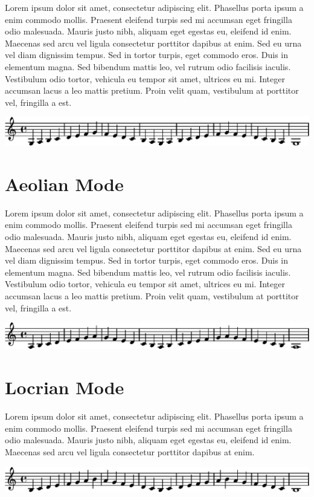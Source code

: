 \documentclass[11pt]{article}
\begin{document}
Lorem ipsum dolor sit amet, consectetur adipiscing elit. Phasellus porta ipsum a enim commodo mollis. Praesent eleifend turpis sed mi accumsan eget fringilla odio malesuada. Mauris justo nibh, aliquam eget egestas eu, eleifend id enim. Maecenas sed arcu vel ligula consectetur porttitor dapibus at enim. Sed eu urna vel diam dignissim tempus. Sed in tortor turpis, eget commodo eros. Duis in elementum magna. Sed bibendum mattis leo, vel rutrum odio facilisis iaculis. Vestibulum odio tortor, vehicula eu tempor sit amet, ultrices eu mi. Integer accumsan lacus a leo mattis pretium. Proin velit quam, vestibulum at porttitor vel, fringilla a est.
\linebreak


\includegraphics[width=17cm]{mixolydian.eps}
\section*{Aeolian Mode}
\label{sec-6}

Lorem ipsum dolor sit amet, consectetur adipiscing elit. Phasellus porta ipsum a enim commodo mollis. Praesent eleifend turpis sed mi accumsan eget fringilla odio malesuada. Mauris justo nibh, aliquam eget egestas eu, eleifend id enim. Maecenas sed arcu vel ligula consectetur porttitor dapibus at enim. Sed eu urna vel diam dignissim tempus. Sed in tortor turpis, eget commodo eros. Duis in elementum magna. Sed bibendum mattis leo, vel rutrum odio facilisis iaculis. Vestibulum odio tortor, vehicula eu tempor sit amet, ultrices eu mi. Integer accumsan lacus a leo mattis pretium. Proin velit quam, vestibulum at porttitor vel, fringilla a est.
\linebreak


\includegraphics[width=17cm]{aeolian.eps}
\section*{Locrian Mode}
\label{sec-7}

Lorem ipsum dolor sit amet, consectetur adipiscing elit. Phasellus porta ipsum a enim commodo mollis. Praesent eleifend turpis sed mi accumsan eget fringilla odio malesuada. Mauris justo nibh, aliquam eget egestas eu, eleifend id enim. Maecenas sed arcu vel ligula consectetur porttitor dapibus at enim.
\linebreak


\includegraphics[width=17cm]{locrian.eps}
\end{document}
